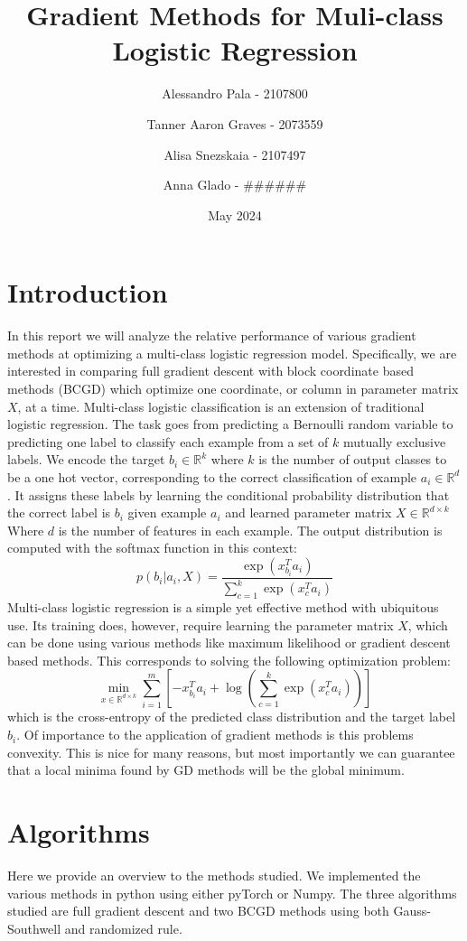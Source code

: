 \documentclass{article}
\title{Gradient Methods for Muli-class Logistic Regression}
\author{Alessandro Pala - 2107800 \and 
Tanner Aaron Graves - 2073559\and 
Alisa Snezskaia - 2107497\and
Anna Glado - ######}
\date{May 2024}
\begin{document}
\maketitle

\section{Introduction}
In this report we will analyze the relative performance of various gradient methods at optimizing a multi-class logistic regression model. Specifically, we are interested in comparing full gradient descent with block coordinate based methods (BCGD) which optimize one coordinate, or column in parameter matrix $X$, at a time. 
Multi-class logistic classification is an extension of traditional logistic regression. The task goes from predicting a Bernoulli random variable to predicting one label to classify each example from a set of $k$ mutually exclusive labels. We encode the target $b_i \in \mathbb{R}^k$ where $k$ is the number of output classes to be a one hot vector, corresponding to the correct classification of example $a_i \in \mathbb{R}^d$. It assigns these labels by learning the conditional probability distribution that the correct label is $b_i$ given example $a_i$ and learned parameter matrix $X \in \mathbb{R}^{d \times k}$ Where $d$ is the number of features in each example. The output distribution is computed with the softmax function in this context: 
$$p(b_i|a_i, X) = \frac{\exp(x_{b_i}^T a_i)}{\sum_{c=1}^k\exp(x_c^Ta_i)}$$
Multi-class logistic regression is a simple yet effective method with ubiquitous use. Its training does, however, require learning the parameter matrix $X$, which can be done using various methods like maximum likelihood or gradient descent based methods. This corresponds to solving the following optimization problem:
$$\min_{x\in\mathbb{R}^{d\times k}} \sum\limits_{i=1}^{m}[-x^T_{b_i}a_{i}+ \log(\sum\limits_{c=1}^k\exp(x_c^{T}a_i))]$$
which is the cross-entropy of the predicted class distribution and the target label $b_i$. Of importance to the application of gradient methods is this problems convexity. This is nice for many reasons, but most importantly we can guarantee that a local minima found by GD methods will be the global minimum.

\section{Algorithms}
Here we provide an overview to the methods studied. We implemented the various methods in python using either pyTorch or Numpy. The three algorithms studied are full gradient descent and two BCGD methods using both Gauss-Southwell and randomized rule.  
\end{document}
